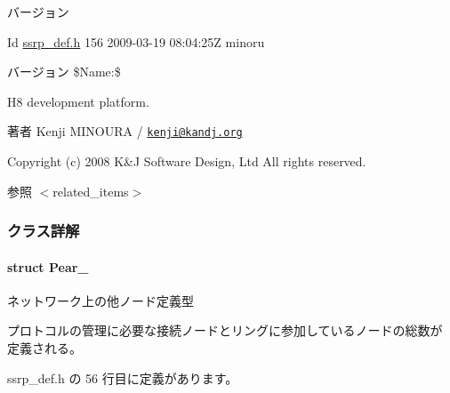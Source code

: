 \begin{DoxyVersion}{バージョン}

\end{DoxyVersion}
\begin{DoxyParagraph}{Id}
\hyperlink{ssrp__def_8h}{ssrp\+\_\+def.\+h} 156 2009-\/03-\/19 08\+:04\+:25\+Z minoru 
\end{DoxyParagraph}
\begin{DoxyVersion}{バージョン}
\$\+Name\+:\$
\end{DoxyVersion}
H8 development platform.

\begin{DoxyAuthor}{著者}
Kenji M\+I\+N\+O\+U\+R\+A / \href{mailto:kenji@kandj.org}{\tt kenji@kandj.\+org}
\end{DoxyAuthor}
Copyright (c) 2008 K\&J Software Design, Ltd All rights reserved.

\begin{DoxySeeAlso}{参照}
$<$related\+\_\+items$>$ 
\end{DoxySeeAlso}


\subsubsection{クラス詳解}
\label{structPear__}
\paragraph{struct Pear\+\_\+}
ネットワーク上の他ノード定義型 

プロトコルの管理に必要な接続ノードとリングに参加しているノードの総数が 定義される。 

 ssrp\+\_\+def.\+h の 56 行目に定義があります。



